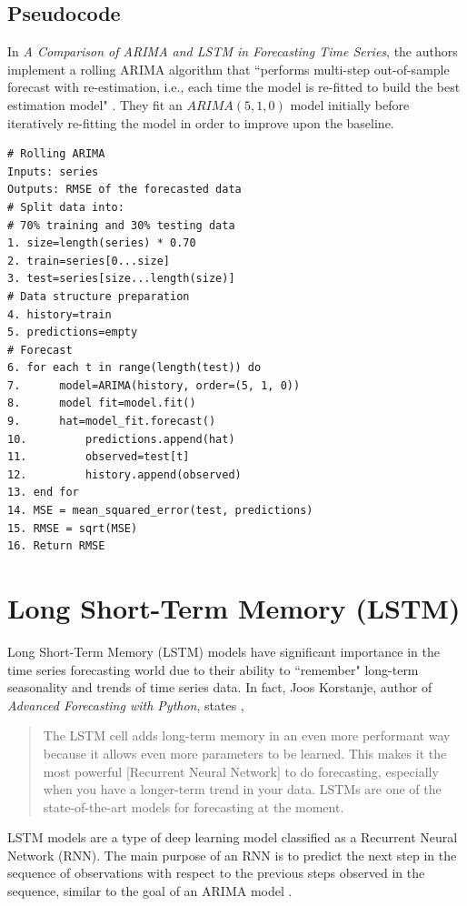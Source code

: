 \documentclass[twoside,11pt]{article}
\begin{document}
\subsection{Pseudocode}
In \textit{A Comparison of ARIMA and LSTM in Forecasting Time Series}, the authors implement a rolling ARIMA algorithm that ``performs multi-step out-of-sample forecast with re-estimation, i.e., each time the model is re-fitted to build the best estimation model" \citep{siami-namini:2018}. They fit an $ARIMA(5, 1, 0)$ model initially before iteratively re-fitting the model in order to improve upon the baseline. 
\begin{lstlisting}[frame=single]
# Rolling ARIMA
Inputs: series
Outputs: RMSE of the forecasted data
# Split data into:
# 70% training and 30% testing data
1. size=length(series) * 0.70
2. train=series[0...size]
3. test=series[size...length(size)]
# Data structure preparation
4. history=train
5. predictions=empty
# Forecast
6. for each t in range(length(test)) do
7.      model=ARIMA(history, order=(5, 1, 0))
8.      model fit=model.fit()
9.      hat=model_fit.forecast()
10.         predictions.append(hat)
11.         observed=test[t]
12.         history.append(observed)
13. end for
14. MSE = mean_squared_error(test, predictions) 
15. RMSE = sqrt(MSE)
16. Return RMSE
\end{lstlisting}

\section{Long Short-Term Memory (LSTM)}
\label{sec:lstm}

Long Short-Term Memory (LSTM) models have significant importance in the time series forecasting world due to their ability to ``remember" long-term seasonality and trends of time series data. In fact, Joos Korstanje, author of \textit{Advanced Forecasting with Python}, states \citep{keith},
\begin{quote}
    The LSTM cell adds long-term memory in an even more performant way because it allows even more parameters to be learned. This makes it the most powerful [Recurrent Neural Network] to do forecasting, especially when you have a longer-term trend in your data. LSTMs are one of the state-of-the-art models for forecasting at the moment.
\end{quote}

LSTM models are a type of deep learning model classified as a Recurrent Neural Network (RNN). The main purpose of an RNN is to predict the next step in the sequence of observations with respect to the previous steps observed in the sequence, similar to the goal of an ARIMA model \citep{siami-namini:2018}. 
\end{document}
